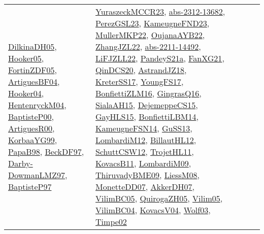 {\begin{longtable}{lp{3cm}>{\raggedright}p{6cm}>{\raggedright}p{6cm}p{8cm}}
\href{papers/DilkinaDH05.pdf}{DilkinaDH05}\cite{DilkinaDH05}, \href{articles/Hooker05.pdf}{Hooker05}\cite{Hooker05}, \href{papers/FortinZDF05.pdf}{FortinZDF05}\cite{FortinZDF05}, \href{papers/ArtiguesBF04.pdf}{ArtiguesBF04}\cite{ArtiguesBF04}, \href{papers/Hooker04.pdf}{Hooker04}\cite{Hooker04}, \href{papers/HentenryckM04.pdf}{HentenryckM04}\cite{HentenryckM04}, \href{articles/BaptisteP00.pdf}{BaptisteP00}\cite{BaptisteP00}, \href{articles/ArtiguesR00.pdf}{ArtiguesR00}\cite{ArtiguesR00}, \href{papers/KorbaaYG99.pdf}{KorbaaYG99}\cite{KorbaaYG99}, \href{articles/PapaB98.pdf}{PapaB98}\cite{PapaB98}, \href{papers/BeckDF97.pdf}{BeckDF97}\cite{BeckDF97}, \href{articles/Darby-DowmanLMZ97.pdf}{Darby-DowmanLMZ97}\cite{Darby-DowmanLMZ97}, \href{papers/BaptisteP97.pdf}{BaptisteP97}\cite{BaptisteP97} & \href{articles/YuraszeckMCCR23.pdf}{YuraszeckMCCR23}\cite{YuraszeckMCCR23}, \href{articles/abs-2312-13682.pdf}{abs-2312-13682}\cite{abs-2312-13682}, \href{papers/PerezGSL23.pdf}{PerezGSL23}\cite{PerezGSL23}, \href{papers/KameugneFND23.pdf}{KameugneFND23}\cite{KameugneFND23}, \href{articles/MullerMKP22.pdf}{MullerMKP22}\cite{MullerMKP22}, \href{papers/OujanaAYB22.pdf}{OujanaAYB22}\cite{OujanaAYB22}, \href{papers/ZhangJZL22.pdf}{ZhangJZL22}\cite{ZhangJZL22}, \href{articles/abs-2211-14492.pdf}{abs-2211-14492}\cite{abs-2211-14492}, \href{papers/LiFJZLL22.pdf}{LiFJZLL22}\cite{LiFJZLL22}, \href{articles/PandeyS21a.pdf}{PandeyS21a}\cite{PandeyS21a}, \href{articles/FanXG21.pdf}{FanXG21}\cite{FanXG21}, \href{articles/QinDCS20.pdf}{QinDCS20}\cite{QinDCS20}, \href{papers/AstrandJZ18.pdf}{AstrandJZ18}\cite{AstrandJZ18}, \href{articles/KreterSS17.pdf}{KreterSS17}\cite{KreterSS17}, \href{papers/YoungFS17.pdf}{YoungFS17}\cite{YoungFS17}, \href{papers/BonfiettiZLM16.pdf}{BonfiettiZLM16}\cite{BonfiettiZLM16}, \href{papers/GingrasQ16.pdf}{GingrasQ16}\cite{GingrasQ16}, \href{papers/SialaAH15.pdf}{SialaAH15}\cite{SialaAH15}, \href{papers/DejemeppeCS15.pdf}{DejemeppeCS15}\cite{DejemeppeCS15}, \href{papers/GayHLS15.pdf}{GayHLS15}\cite{GayHLS15}, \href{articles/BonfiettiLBM14.pdf}{BonfiettiLBM14}\cite{BonfiettiLBM14}, \href{articles/KameugneFSN14.pdf}{KameugneFSN14}\cite{KameugneFSN14}, \href{papers/GuSS13.pdf}{GuSS13}\cite{GuSS13}, \href{articles/LombardiM12.pdf}{LombardiM12}\cite{LombardiM12}, \href{papers/BillautHL12.pdf}{BillautHL12}\cite{BillautHL12}, \href{papers/SchuttCSW12.pdf}{SchuttCSW12}\cite{SchuttCSW12}, \href{articles/TrojetHL11.pdf}{TrojetHL11}\cite{TrojetHL11}, \href{articles/KovacsB11.pdf}{KovacsB11}\cite{KovacsB11}, \href{papers/LombardiM09.pdf}{LombardiM09}\cite{LombardiM09}, \href{papers/ThiruvadyBME09.pdf}{ThiruvadyBME09}\cite{ThiruvadyBME09}, \href{articles/LiessM08.pdf}{LiessM08}\cite{LiessM08}, \href{papers/MonetteDD07.pdf}{MonetteDD07}\cite{MonetteDD07}, \href{papers/AkkerDH07.pdf}{AkkerDH07}\cite{AkkerDH07}, \href{articles/VilimBC05.pdf}{VilimBC05}\cite{VilimBC05}, \href{papers/QuirogaZH05.pdf}{QuirogaZH05}\cite{QuirogaZH05}, \href{papers/Vilim05.pdf}{Vilim05}\cite{Vilim05}, \href{papers/VilimBC04.pdf}{VilimBC04}\cite{VilimBC04}, \href{papers/KovacsV04.pdf}{KovacsV04}\cite{KovacsV04}, \href{papers/Wolf03.pdf}{Wolf03}\cite{Wolf03}, \href{articles/Timpe02.pdf}{Timpe02}\cite{Timpe02} & 
\end{longtable}}
